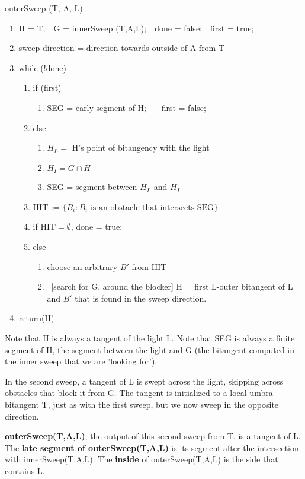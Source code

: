 \documentclass[12pt]{article}
\begin{document}
\centerline{outerSweep (T, A, L)}
\begin{enumerate}
\item	H = T;\ \ G = innerSweep (T,A,L);\ \ done = false;\ \ first = true;
\item	sweep direction = direction towards outside of A from T
\item   while (!done)
\begin{enumerate}
\item   if (first) 
\begin{enumerate}
\item	SEG = early segment of H; \ \ \ first = false;
\end{enumerate}
\item	else
\begin{enumerate}
\item	$H_L = $ H's point of bitangency with the light
\item	$H_I = G \cap H$
\item	SEG = segment between $H_L$ and $H_I$
\end{enumerate}
\item	HIT := $\{ B_i: B_i \mbox{ is an obstacle that intersects SEG}\}$
\item   if $\mbox{HIT} = \emptyset$, done = true;
\item 	else
\begin{enumerate}
\item	choose an arbitrary $B'$ from HIT
\item   \ [search for G, around the blocker] H = first L-outer bitangent of L and $B'$ that is found
	in the sweep direction.
\end{enumerate}			
\end{enumerate}
\item 	return(H)
\end{enumerate}

Note that H is always a tangent of the light L.
Note that SEG is always a finite segment of H, the segment between the light
and G (the bitangent computed in the inner sweep that we are 'looking for').

In the second sweep, a tangent of L is swept across the light, skipping across
obstacles that block it from G.
The tangent is initialized to a local umbra bitangent T, just as with the
first sweep, but we now sweep in the opposite direction.

\begin{defn2}
{\bf outerSweep(T,A,L)}, the output of this second sweep from T.
is a tangent of L.
The {\bf late segment of outerSweep(T,A,L)} is its segment after the intersection with 
innerSweep(T,A,L).
The {\bf inside} of outerSweep(T,A,L) is the side that contains L.
\end{defn2}
\end{document}
